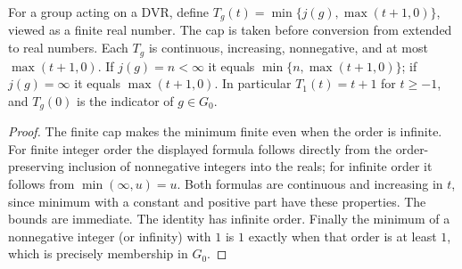 \begin{lemma}
\label{fw:truncated-order}
\leanok
For a group acting on a DVR, define
$T_g(t)=\min\{j(g),\max(t+1,0)\}$, viewed as a finite real number.
The cap is taken before conversion from extended to real numbers.
Each $T_g$ is continuous, increasing, nonnegative, and at most
$\max(t+1,0)$. If $j(g)=n<\infty$ it equals
$\min\{n,\max(t+1,0)\}$; if $j(g)=\infty$ it equals $\max(t+1,0)$.
In particular $T_1(t)=t+1$ for $t\geq-1$, and
$T_g(0)$ is the indicator of $g\in G_0$.
\end{lemma}
\begin{proof}
The finite cap makes the minimum finite even when the order is infinite.
For finite integer order the displayed formula follows directly from
the order-preserving inclusion of nonnegative integers into the reals;
for infinite order it follows from $\min(\infty,u)=u$.
Both formulas are continuous and increasing in $t$, since minimum with
a constant and positive part have these properties. The bounds are
immediate. The identity has infinite order. Finally the minimum of a
nonnegative integer (or infinity) with $1$ is $1$ exactly when that
order is at least $1$, which is precisely membership in $G_0$.
\end{proof}

